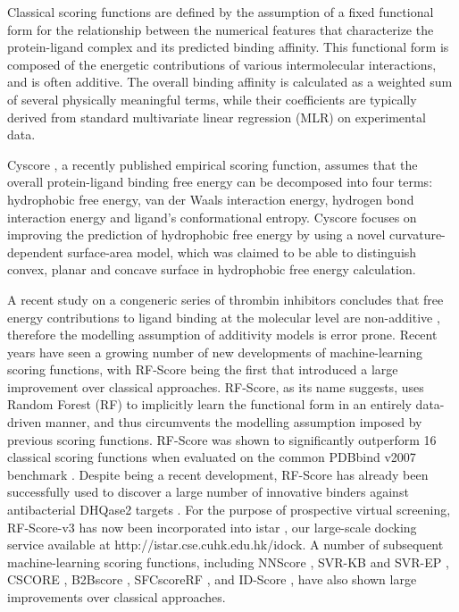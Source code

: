 \documentclass[linenumbers]{bmcart}
\begin{document}
Classical scoring functions are defined by the assumption of a fixed functional form for the relationship between the numerical features that characterize the protein-ligand complex and its predicted binding affinity. This functional form is composed of the energetic contributions of various intermolecular interactions, and is often additive. The overall binding affinity is calculated as a weighted sum of several physically meaningful terms, while their coefficients are typically derived from standard multivariate linear regression (MLR) on experimental data.

Cyscore \cite{1372}, a recently published empirical scoring function, assumes that the overall protein-ligand binding free energy can be decomposed into four terms: hydrophobic free energy, van der Waals interaction energy, hydrogen bond interaction energy and ligand's conformational entropy. Cyscore focuses on improving the prediction of hydrophobic free energy by using a novel curvature-dependent surface-area model, which was claimed to be able to distinguish convex, planar and concave surface in hydrophobic free energy calculation.

A recent study on a congeneric series of thrombin inhibitors concludes that free energy contributions to ligand binding at the molecular level are non-additive \cite{1416}, therefore the modelling assumption of additivity models is error prone. Recent years have seen a growing number of new developments of machine-learning scoring functions, with RF-Score \cite{564} being the first that introduced a large improvement over classical approaches. RF-Score, as its name suggests, uses Random Forest (RF) \cite{1309} to implicitly learn the functional form in an entirely data-driven manner, and thus circumvents the modelling assumption imposed by previous scoring functions. RF-Score was shown to significantly outperform 16 classical scoring functions when evaluated on the common PDBbind v2007 benchmark \cite{564}. Despite being a recent development, RF-Score has already been successfully used to discover a large number of innovative binders against antibacterial DHQase2 targets \cite{1281}. For the purpose of prospective virtual screening, RF-Score-v3 has now been incorporated into istar \cite{1362}, our large-scale docking service available at http://istar.cse.cuhk.edu.hk/idock. A number of subsequent machine-learning scoring functions, including NNScore \cite{977}, SVR-KB and SVR-EP \cite{963}, CSCORE \cite{1194}, B2Bscore \cite{1410}, SFCscoreRF \cite{1347}, and ID-Score \cite{1305}, have also shown large improvements over classical approaches.
\end{document}
